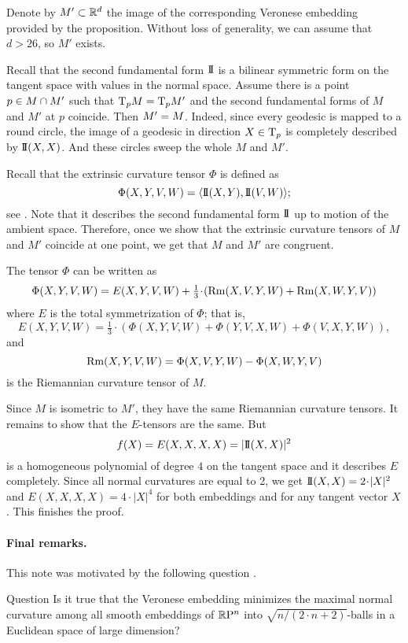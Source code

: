 \documentclass[a4paper,10pt]{article}
\begin{document}
Denote by $M'\subset \mathbb{R}^d$ the image of the corresponding Veronese embedding provided by the proposition.
Without loss of generality, we can assume that $d>26$, so $M'$ exists.

Recall that the second fundamental form $\mathrm{I}\!\mathrm{I}$ is a bilinear symmetric form on the tangent space with values in the normal space.
Assume there is a point $p\z\in M\cap M'$ such that $\mathrm{T}_pM=\mathrm{T}_pM'$ and the second fundamental forms of $M$ and $M'$ at $p$ coincide.
Then $M'\z=M$.
Indeed, since every geodesic is mapped to a round circle, the image of a geodesic in direction $X\in \mathrm{T}_p$ is completely described by $\mathrm{I}\!\mathrm{I}(X,X)$.
And these circles sweep the whole $M$ and $M'$.

Recall that the extrinsic curvature tensor $\Phi$ is defined as
\[\Phi(X,Y,V,W)=\langle \mathrm{I}\!\mathrm{I}(X,Y),\mathrm{I}\!\mathrm{I}(V,W)\rangle;\]
see \cite{petrunin2003}.
Note that it describes the second fundamental form $\mathrm{I}\!\mathrm{I}$ up to motion of the ambient space.
Therefore, once we show that the extrinsic curvature tensors of $M$ and $M'$ coincide at one point,
we get that $M$ and $M'$ are congruent.

The tensor $\Phi$ can be written as
\[\Phi(X,Y,V,W)=E(X,Y,V,W)+\tfrac 1 3\cdot(\Rm(X,V,Y,W)+\Rm(X,W,Y,V))\]
where $E$ is the total symmetrization of $\Phi$; that is,
$$E(X,Y,V,W)=\tfrac 1 3\cdot
(\Phi(X,Y,V,W)+\Phi(Y,V,X,W)+\Phi(V,X,Y,W)),$$
and
$$\operatorname{\rm Rm}(X,Y,V,W)=\Phi(X,V,Y,W)-\Phi(X,W,Y,V)$$
is the Riemannian curvature tensor of $M$.

Since $M$ is isometric to $M'$, they have the same Riemannian curvature tensors.
It remains to show that the $E$-tensors are the same.
But 
\[f(X)=E(X,X,X,X)\z=|\II(X,X)|^2\]
is a homogeneous polynomial of degree $4$ on the tangent space 
and it describes $E$ completely.
Since all normal curvatures are equal to 2,
we get $\II(X,X)\z=2\cdot|X|^2$ and $E(X,X,X,X)=4\cdot|X|^4$ 
for both embeddings and for any tangent vector $X$.
This finishes the proof.
\qeds

\paragraph{Final remarks.}
This note was motivated by the following question \cite{petrunin2023}.

\begin{thm}{Question}
Is it true that the Veronese embedding minimizes the maximal normal curvature among all smooth embeddings of $\mathbb{R}\mathrm{P}^n$ into $\sqrt{n/(2\cdot n+2)}$-balls in a Euclidean space of large dimension?
\end{thm}
\end{document}
